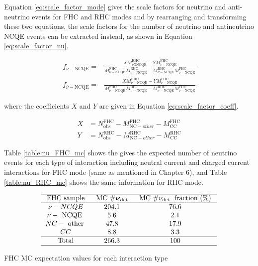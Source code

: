 Equation \ref{eq:scale_factor_mode} gives the scale factors for neutrino and anti-neutrino events for FHC and RHC modes and by rearranging and transforming these two equations, the scale factors for the number of neutrino and antineutrino NCQE events can be extracted instead, as shown in Equation \ref{eq:scale_factor_nu}. 

\begin{equation}
    \begin{aligned}
    f_{\nu-\mathrm{NCQE}}= & \frac{X M_{\bar{\nu} \mathrm{N} \mathrm{NCQE}}^{\mathrm{RHC}}-Y M_{\bar{\nu}-\mathrm{NCQE}}^{\mathrm{FHC}}}{M_{\nu-\mathrm{NCQE}}^{\mathrm{FHC}} M_{\bar{\nu}-\mathrm{NCQE}}^{\mathrm{RHC}}-M_{\nu-\mathrm{NCQE}}^{\mathrm{RHC}} M_{\bar{\nu}-\mathrm{NCQE}}^{\mathrm{FHC}}} \\
    f_{\bar{\nu}-\mathrm{NCQE}}= & \frac{X M_{\nu-\mathrm{NCQE}}^{\mathrm{RHC}}-Y M_{\nu-\mathrm{NCQE}}^{\mathrm{FHC}}}{M_{\bar{\nu}-\mathrm{NCQE}}^{\mathrm{FHC}} M_{\nu-\mathrm{NCQE}}^{\mathrm{RHC}}-M_{\bar{\nu}-\mathrm{NCQE}}^{\mathrm{RHC}} M_{\nu-\mathrm{NCQE}}^{\mathrm{FHC}}}
    \end{aligned}
\label{eq:scale_factor_nu}
\end{equation}

where the coefficients $X$ and $Y$ are given in Equation \ref{eq:scale_factor_coeff}.


\begin{equation}
    \begin{aligned}
    X & =N_{\mathrm{obs}}^{\mathrm{FHC}}-M_{\mathrm{NC}-o t h e r}^{\mathrm{FHC}}-M_{\mathrm{CC}}^{\mathrm{FHC}} \\
    Y & =N_{\mathrm{obs}}^{\mathrm{RHC}}-M_{\mathrm{NC}-o t h e r}^{\mathrm{RHC}}-M_{\mathrm{CC}}^{\mathrm{RHC}}
    \end{aligned}
\label{eq:scale_factor_coeff}
\end{equation}


Table \ref{table:nu_FHC_mc} shows the gives the expected number of neutrino events for each type of interaction including neutral current and charged current interactions for FHC mode (same as mentioned in Chapter 6), and Table \ref{table:nu_RHC_mc} shows the same information for RHC mode.


\begin{table}
    $$
    \begin{array}{ccc}
    \hline \text { FHC sample } & \text { MC } \# \boldsymbol{\nu}_{\text {det }} & \text { MC } \# \nu_{\text {det }} \text { fraction (\%) } \\
    \hline \nu-N C Q E & 204.1 & 76.6 \\
    \bar{\nu}-\text { NCQE } & 5.6 & 2.1 \\
    N C-\text { other } & 47.8 & 17.9 \\
    C C & 8.8 & 3.3 \\
    \hline \text { Total } & 266.3 & 100 \\
    \hline
    \end{array}
    $$
    \caption{FHC MC expectation values for each interaction type}
    \label{table:nu_FHC_mc}
\end{table}



